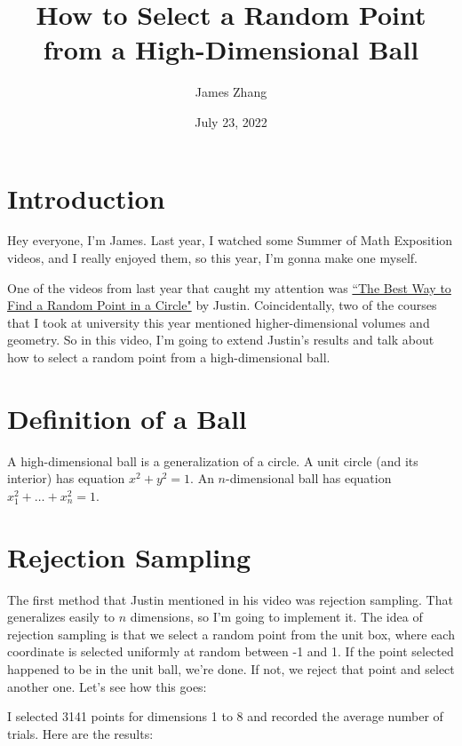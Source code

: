 \documentclass{article}
\title{How to Select a Random Point from a High-Dimensional Ball}
\author{James Zhang}
\date{July 23, 2022}
\begin{document}
\maketitle

\section{Introduction}

Hey everyone, I'm James. Last year, I watched some Summer of Math Exposition videos, and I really enjoyed them, so this year, I'm gonna make one myself.

One of the videos from last year that caught my attention was \href{https://www.youtube.com/watch?v=4y_nmpv-9lI&list=PLnQX-jgAF5pTkwtUuVpqS5tuWmJ-6ZM-Z&index=6&t=3s}{``The Best Way to Find a Random Point in a Circle"} by Justin. Coincidentally, two of the courses that I took at university this year mentioned higher-dimensional volumes and geometry. So in this video, I'm going to extend Justin's results and talk about how to select a random point from a high-dimensional ball.

\section{Definition of a Ball}

A high-dimensional ball is a generalization of a circle. A unit circle (and its interior) has equation $x^2 + y^2 = 1$. An $n$-dimensional ball has equation $x_1^2 + \ldots + x_n^2 = 1$.

\section{Rejection Sampling}

The first method that Justin mentioned in his video was rejection sampling. That generalizes easily to $n$ dimensions, so I'm going to implement it. The idea of rejection sampling is that we select a random point from the unit box, where each coordinate is selected uniformly at random between -1 and 1. If the point selected happened to be in the unit ball, we're done. If not, we reject that point and select another one. Let's see how this goes:

I selected 3141 points for dimensions 1 to 8 and recorded the average number of trials. Here are the results:


\end{document}
